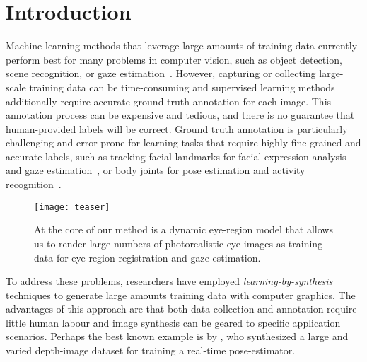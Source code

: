 
\section{Introduction}


Machine learning methods that leverage large amounts of training data currently perform best for many problems in computer vision, such as object detection, scene recognition, or gaze estimation~\cite{zhou2014learning,girshick2014rich,zhang15_cvpr}.
However, capturing or collecting large-scale training data can be time-consuming
and supervised learning methods additionally require accurate ground truth annotation for each image.
This annotation process can be expensive and tedious, and there is no guarantee that human-provided labels will be correct.
Ground truth annotation is particularly challenging and error-prone for learning tasks that require highly fine-grained and accurate labels, such as tracking facial landmarks for facial expression analysis and gaze estimation~, or body joints for pose estimation and activity recognition~.

\begin{figure}
    \texttt{[image: teaser]}
    \caption{At the core of our method is a dynamic eye-region model that allows us to render large numbers of photorealistic eye images as training data for eye region registration and gaze estimation.}
    \label{fig:teaser}
\end{figure}

To address these problems, researchers have employed \emph{learning-by-synthesis} techniques to generate large amounts training data with computer graphics.
The advantages of this approach are that both data collection and annotation require little human labour and image synthesis can be geared to specific application scenarios.
Perhaps the best known example is by \citet{shotton2013real}, who synthesized a large and varied depth-image dataset for training a real-time pose-estimator.

